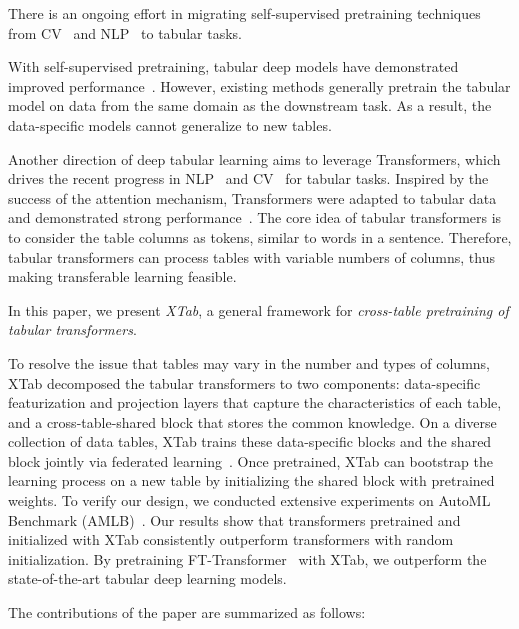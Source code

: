There is an ongoing effort in migrating self-supervised pretraining techniques from CV~\citep{chen2020simple} and NLP~\citep{devlin2018bert} to tabular tasks.

With self-supervised pretraining, tabular deep models have demonstrated improved performance~\citep{ucar2021subtab, bahri2021scarf, majmundar2022met}. However, existing methods generally pretrain the tabular model on data from the same domain as the downstream task. As a result, the data-specific models cannot generalize to new tables.

Another direction of deep tabular learning aims to leverage Transformers, which drives the recent progress in NLP~\citep{vaswani2017attention} and CV~\citep{dosovitskiy2020image} for tabular tasks. Inspired by the success of the attention mechanism, Transformers were adapted to tabular data~\citep{gorishniy2021revisiting, somepalli2021saint, wu2021fastformer, wang2022transtab} and demonstrated strong performance~\citep{grinsztajn2022tree}. The core idea of tabular transformers is to consider the table columns as tokens, similar to words in a sentence. Therefore, tabular transformers can process tables with variable numbers of columns, thus making transferable learning \citep{wang2022transtab} feasible.

In this paper, we present \textit{XTab}, a general framework for \textit{cross-table pretraining of tabular transformers}.

To resolve the issue that tables may vary in the number and types of columns, XTab decomposed the tabular transformers to two components: data-specific featurization and projection layers that capture the characteristics of each table, and a cross-table-shared block that stores the common knowledge. On a diverse collection of data tables, XTab trains these data-specific blocks and the shared block jointly via federated learning~\cite{collins2022fedavg}. Once pretrained, XTab can bootstrap the learning process on a new table by initializing the shared block with pretrained weights.  To verify our design, we conducted extensive experiments on AutoML Benchmark (AMLB)~\cite{gijsbers2022amlb}. Our results show that transformers pretrained and initialized with XTab consistently outperform transformers with random initialization. By pretraining FT-Transformer~\citep{gorishniy2021revisiting} with XTab, we outperform the state-of-the-art tabular deep learning models.

The contributions of the paper are summarized as follows:

